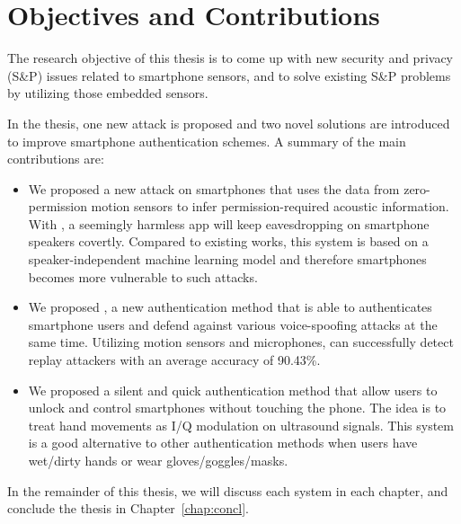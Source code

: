 {\color{blue}

\section{Objectives and Contributions}
	The research objective of this thesis is to come up with new security and privacy (S\&P) issues related to smartphone sensors, and to solve existing S\&P problems by utilizing those embedded sensors. 
	
	In the thesis, one new attack is proposed and two novel solutions are introduced to improve smartphone authentication schemes. A summary of the main  contributions are:
	\begin{itemize}
		\item We proposed a new attack on smartphones that uses the data from zero-permission motion sensors to infer permission-required acoustic information. With {\spp}, a seemingly harmless app will keep eavesdropping on smartphone speakers covertly. Compared to existing works, this {\spp} system is based on a speaker-independent machine learning model and therefore smartphones becomes more vulnerable to such attacks.
		
		\item We proposed {\mv}, a new authentication method that is able to authenticates smartphone users and defend against various voice-spoofing attacks at the same time. Utilizing motion sensors and microphones, {\mv} can successfully detect replay attackers with an average accuracy of 90.43\%. 
		
		\item We proposed a silent and quick authentication method {\uu} that allow users to unlock and control smartphones without touching the phone. The idea is to treat hand movements as I/Q modulation on ultrasound signals. This system is a good alternative to other authentication methods when users have wet/dirty hands or wear gloves/goggles/masks.
	\end{itemize}
 }




In the remainder of this thesis, we will discuss each system in each chapter, and conclude the thesis in Chapter~\ref{chap:concl}. 

